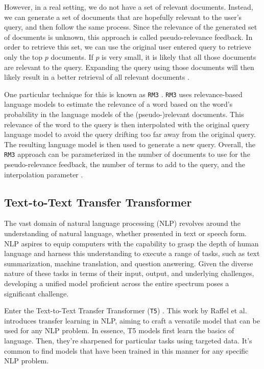 \documentclass[sigconf]{acmart}
\begin{document}
However, in a real setting, we do not have a set of relevant documents. Instead, we can generate a set of documents that are hopefully relevant to the user's query, and then follow the same process. Since the relevance of the generated set of documents is unknown, this approach is called pseudo-relevance feedback. In order to retrieve this set, we can use the original user entered query to retrieve only the top $p$ documents. If $p$ is very small, it is likely that all those documents are relevant to the query. Expanding the query using those documents will then likely result in a better retrieval of all relevant documents \cite{vaidyanathan2015query}.

One particular technique for this is known as \texttt{RM3} \cite{abdul2004umass}. \texttt{RM3} uses relevance-based language models \cite{lavrenko2017relevance} to estimate the relevance of a word based on the word's probability in the language models of the (pseudo-)relevant documents. This relevance of the word to the query is then interpolated with the original query language model to avoid the query drifting too far away from the original query. The resulting language model is then used to generate a new query. Overall, the \texttt{RM3} approach can be parameterized in the number of documents to use for the pseudo-relevance feedback, the number of terms to add to the query, and the interpolation parameter \cite{abdul2004umass,lavrenko2017relevance,chen2022pseudo}.

\subsection{Text-to-Text Transfer Transformer}\label{sec:t5}
The vast domain of natural language processing (NLP) revolves around the understanding of natural language, whether presented in text or speech form. NLP aspires to equip computers with the capability to grasp the depth of human language and harness this understanding to execute a range of tasks, such as text summarization, machine translation, and question answering. Given the diverse nature of these tasks in terms of their input, output, and underlying challenges, developing a unified model proficient across the entire spectrum poses a significant challenge.

Enter the Text-to-Text Transfer Transformer (\texttt{T5}) \cite{raffel2020exploring}. This work by Raffel et al. introduces transfer learning in NLP, aiming to craft a versatile model that can be used for any NLP problem. In essence, T5 models first learn the basics of language. Then, they're sharpened for particular tasks using targeted data. It's common to find models that have been trained in this manner for any specific NLP problem.
\end{document}
